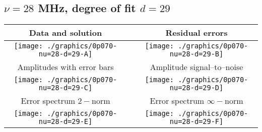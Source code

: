

% 

\clearpage{}
\break{}

\subsection{$\nu = 28$ MHz, degree of fit $d = 29$}

\begin{table}[h]
    \begin{center}
        \begin{tabular}{ccc}
            Data and solution & \quad & Residual errors \\\hline
            \texttt{[image: ./graphics/0p070-nu=28-d=29-A]} &&
            \texttt{[image: ./graphics/0p070-nu=28-d=29-B]} \\[15pt]
            Amplitudes with error bars && Amplitude signal--to--noise \\\hline
            \texttt{[image: ./graphics/0p070-nu=28-d=29-C]} &&
            \texttt{[image: ./graphics/0p070-nu=28-d=29-D]} \\[15pt]
            Error spectrum $2-$norm && Error spectrum $\infty-$norm \\\hline
            \texttt{[image: ./graphics/0p070-nu=28-d=29-E]} &&
            \texttt{[image: ./graphics/0p070-nu=28-d=29-F]} \\[15pt]
        \end{tabular}
    \end{center}
\label{fig:elev=70, nu=28}
\end{table}



\endinput
